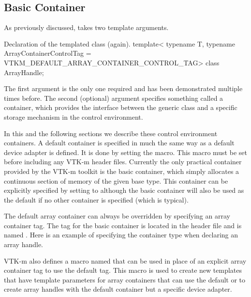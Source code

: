 \subsection{Basic Container}


As previously discussed,  takes two template arguments.
\begin{vtkmexample}{Declaration of the \protect{} templated class (again).}
template<
    typename T,
    typename ArrayContainerControlTag = VTKM_DEFAULT_ARRAY_CONTAINER_CONTROL_TAG>
class ArrayHandle;
\end{vtkmexample}
The first argument is the only one required and has been demonstrated
multiple times before. The second (optional) argument specifies something
called a container, which provides the interface between the generic
 class and a specific storage mechanism in the
control environment.

In this and the following sections we describe these control environment
containers. A default container is specified in much the same way as a
default device adapter is defined. It is done by setting the
 macro. This macro must be set
before including any VTK-m header files. Currently the only practical
container provided by the VTK-m toolkit is the basic container, which simply
allocates a continuous section of memory of the given base type. This
container can be explicitly specified by setting
 to
 although the basic
container will also be used as the default if no other container is
specified (which is typical).

The default array container can always be overridden by specifying an array
container tag. The tag for the basic container is located in the
 header file and is named
. Here is an example of specifying
the container type when declaring an array handle.


VTK-m also defines a macro named
 that can be used
in place of an explicit array container tag to use the default tag. This
macro is used to create new templates that have template parameters for
array containers that can use the default or to create array handles with
the default container but a specific device adapter.

